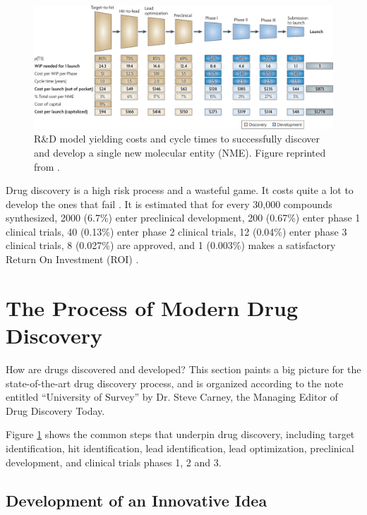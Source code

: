 \begin{figure}
\centering
\includegraphics[width=\textwidth]{Background/Figures/DrugDiscoveryProcess.png}
\caption{R\&D model yielding costs and cycle times to successfully discover and develop a single new molecular entity (NME). Figure reprinted from \citep{716-2010}.}
\label{fig:DrugDiscoveryProcess}
\end{figure}

Drug discovery is a high risk process and a wasteful game. It costs quite a lot to develop the ones that fail \citep{688-2011}. It is estimated that for every 30,000 compounds synthesized, 2000 (6.7\%) enter preclinical development, 200 (0.67\%) enter phase 1 clinical trials, 40 (0.13\%) enter phase 2 clinical trials, 12 (0.04\%) enter phase 3 clinical trials, 8 (0.027\%) are approved, and 1 (0.003\%) makes a satisfactory Return On Investment (ROI) \citep{713-2001}.

\section{The Process of Modern Drug Discovery}

How are drugs discovered and developed? This section paints a big picture for the state-of-the-art drug discovery process, and is organized according to the note entitled ``University of Survey'' by Dr. Steve Carney, the Managing Editor of Drug Discovery Today.

Figure \ref{fig:DrugDiscoveryProcess} \citep{716-2010} shows the common steps that underpin drug discovery, including target identification, hit identification, lead identification, lead optimization, preclinical development, and clinical trials phases 1, 2 and 3.

\subsection{Development of an Innovative Idea}

